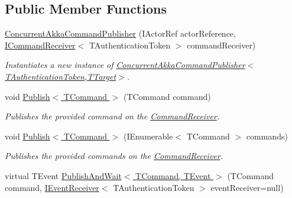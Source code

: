 \subsection*{Public Member Functions}
\begin{DoxyCompactItemize}
\item 
\hyperlink{classCqrs_1_1Akka_1_1Commands_1_1ConcurrentAkkaCommandPublisher_a289c81c8877d2cf83b26f6be7e56f26b_a289c81c8877d2cf83b26f6be7e56f26b}{Concurrent\+Akka\+Command\+Publisher} (I\+Actor\+Ref actor\+Reference, \hyperlink{interfaceCqrs_1_1Commands_1_1ICommandReceiver}{I\+Command\+Receiver}$<$ T\+Authentication\+Token $>$ command\+Receiver)
\begin{DoxyCompactList}\small\item\em Instantiates a new instance of \hyperlink{classCqrs_1_1Akka_1_1Commands_1_1ConcurrentAkkaCommandPublisher_a289c81c8877d2cf83b26f6be7e56f26b_a289c81c8877d2cf83b26f6be7e56f26b}{Concurrent\+Akka\+Command\+Publisher$<$\+T\+Authentication\+Token,\+T\+Target$>$}. \end{DoxyCompactList}\item 
void \hyperlink{classCqrs_1_1Akka_1_1Commands_1_1ConcurrentAkkaCommandPublisher_a1644fd35a9946df2e99be1044324c4cf_a1644fd35a9946df2e99be1044324c4cf}{Publish$<$ T\+Command $>$} (T\+Command command)
\begin{DoxyCompactList}\small\item\em Publishes the provided {\itshape command}  on the \hyperlink{classCqrs_1_1Akka_1_1Commands_1_1ConcurrentAkkaCommandPublisher_a000c2cddf20768b5feec16a8f4e02587_a000c2cddf20768b5feec16a8f4e02587}{Command\+Receiver}. \end{DoxyCompactList}\item 
void \hyperlink{classCqrs_1_1Akka_1_1Commands_1_1ConcurrentAkkaCommandPublisher_af8c681932cd7586a70cb65db8cbb5bfe_af8c681932cd7586a70cb65db8cbb5bfe}{Publish$<$ T\+Command $>$} (I\+Enumerable$<$ T\+Command $>$ commands)
\begin{DoxyCompactList}\small\item\em Publishes the provided {\itshape commands}  on the \hyperlink{classCqrs_1_1Akka_1_1Commands_1_1ConcurrentAkkaCommandPublisher_a000c2cddf20768b5feec16a8f4e02587_a000c2cddf20768b5feec16a8f4e02587}{Command\+Receiver}. \end{DoxyCompactList}\item 
virtual T\+Event \hyperlink{classCqrs_1_1Akka_1_1Commands_1_1ConcurrentAkkaCommandPublisher_ad88c8edbc1e145807a400a246cb6531b_ad88c8edbc1e145807a400a246cb6531b}{Publish\+And\+Wait$<$ T\+Command, T\+Event $>$} (T\+Command command, \hyperlink{interfaceCqrs_1_1Events_1_1IEventReceiver}{I\+Event\+Receiver}$<$ T\+Authentication\+Token $>$ event\+Receiver=null)

\end{DoxyCompactItemize}
